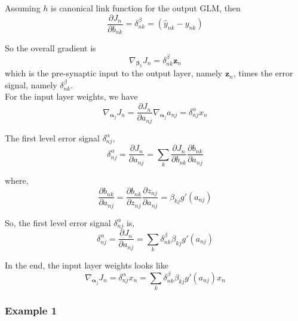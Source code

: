 \documentclass[12pt,a4paper]{article}%
\theoremstyle{definition}
\theoremstyle{plain}
\numberwithin{equation}{section}
\begin{document}
Assuming $h$ is canonical link function for the output GLM, then 
\begin{equation}
\frac{\partial J_{n}}{\partial b_{nk}} = \delta^{\beta}_{nk} = (\hat{y}_{nk}-y_{nk})
\end{equation}

So the overall gradient is 
\begin{equation}
\nabla_{\boldsymbol{\beta}_{k}} J_{n} = \delta^{\beta}_{nk} \mathbf{z}_{n}
\end{equation}
which is the pre-synaptic input to the output layer, namely $\mathbf{z}_{n}$, times the error signal, namely $\delta^{\beta}_{nk}$.~\\

For the input layer weights, we have 
\begin{equation}
\nabla_{\boldsymbol{\alpha}_{j}} J_{n} = \frac{\partial J_{n}}{\partial a_{nj}} \nabla_{\boldsymbol{\alpha}_{j}} a_{nj} = \delta^{\alpha}_{nj} x_{n}
\end{equation}

The first level error signal $\delta^{\alpha}_{nj}$, 
\begin{equation}
\delta^{\alpha}_{nj} =  \frac{\partial J_{n}}{\partial a_{nj}} = \sum\limits_{k} \frac{\partial J_{n}}{\partial b_{nk}} \frac{\partial b_{nk}}{\partial a_{nj}}
\end{equation}

where,
\begin{equation}
\frac{\partial b_{nk}}{\partial a_{nj}} = \frac{\partial b_{nk}}{\partial z_{nj}} \frac{\partial z_{nj}}{\partial a_{nj}} = \beta_{kj} g'(a_{nj})
\end{equation}

So, the first level error signal $\delta^{\alpha}_{nj}$ is,
\begin{equation}
\delta^{\alpha}_{nj} =  \frac{\partial J_{n}}{\partial a_{nj}} = \sum\limits_{k} \delta^{\beta}_{nk} \beta_{kj} g'(a_{nj})
\end{equation}

In the end, the input layer weights looks like
\begin{equation}
\nabla_{\boldsymbol{\alpha}_{j}} J_{n} = \delta^{\alpha}_{nj} x_{n} = \sum\limits_{k} \delta^{\beta}_{nk} \beta_{kj} g'(a_{nj})x_{n}
\end{equation}

\subsubsection{Example 1}
\end{document}
